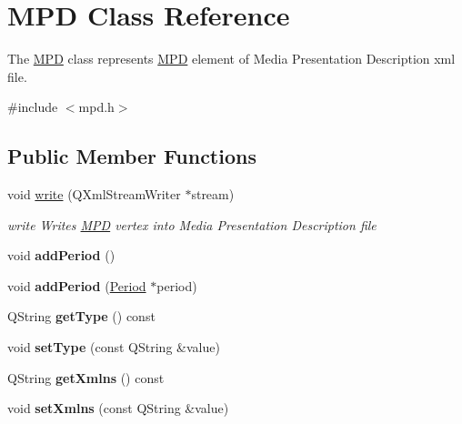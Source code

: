 \hypertarget{class_m_p_d}{\section{M\-P\-D Class Reference}
\label{class_m_p_d}
}


The \hyperlink{class_m_p_d}{M\-P\-D} class represents \hyperlink{class_m_p_d}{M\-P\-D} element of Media Presentation Description xml file.  




{\ttfamily \#include $<$mpd.\-h$>$}

\subsection*{Public Member Functions}
\begin{DoxyCompactItemize}
\item 
void \hyperlink{class_m_p_d_a07c1991933d680f2a7843ce2f6a2c872}{write} (Q\-Xml\-Stream\-Writer $\ast$stream)
\begin{DoxyCompactList}\small\item\em write Writes \hyperlink{class_m_p_d}{M\-P\-D} vertex into Media Presentation Description file \end{DoxyCompactList}\item 
\hypertarget{class_m_p_d_abef22bc61326c9cab64b3c81f20c2ed4}{void {\bfseries add\-Period} ()}\label{class_m_p_d_abef22bc61326c9cab64b3c81f20c2ed4}

\item 
\hypertarget{class_m_p_d_a7db11aa6e893900945dfab48a49badf4}{void {\bfseries add\-Period} (\hyperlink{class_period}{Period} $\ast$period)}\label{class_m_p_d_a7db11aa6e893900945dfab48a49badf4}

\item 
\hypertarget{class_m_p_d_a5ea10b02c9a9b987cd925a73c1b76598}{Q\-String {\bfseries get\-Type} () const }\label{class_m_p_d_a5ea10b02c9a9b987cd925a73c1b76598}

\item 
\hypertarget{class_m_p_d_ade3d7bf9b45b7f9e92a07092ff7973e9}{void {\bfseries set\-Type} (const Q\-String \&value)}\label{class_m_p_d_ade3d7bf9b45b7f9e92a07092ff7973e9}

\item 
\hypertarget{class_m_p_d_a3794a668a5e1ec568369b95d87f60f52}{Q\-String {\bfseries get\-Xmlns} () const }\label{class_m_p_d_a3794a668a5e1ec568369b95d87f60f52}

\item 
\hypertarget{class_m_p_d_affdfac3c4819f6fec7a764f6d3de74f6}{void {\bfseries set\-Xmlns} (const Q\-String \&value)}\label{class_m_p_d_affdfac3c4819f6fec7a764f6d3de74f6}


\end{DoxyCompactItemize}
